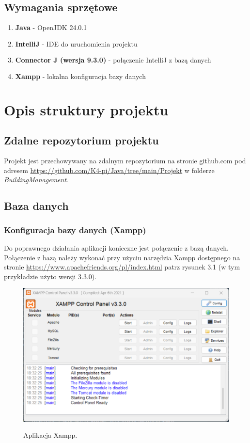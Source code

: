 \section{Wymagania sprzętowe}
\begin{enumerate}
    \item \textbf{Java} - OpenJDK 24.0.1
    \item \textbf{IntelliJ} - IDE do uruchomienia projektu
    \item \textbf{Connector J (wersja 9.3.0)} - połączenie IntelliJ z bazą danych
    \item \textbf{Xampp} - lokalna konfiguracja bazy danych
\end{enumerate}
\chapter{Opis struktury projektu}
\section{Zdalne repozytorium projektu}
Projekt jest przechowywany na zdalnym repozytorium na stronie github.com pod adresem 
\newline \url{https://github.com/K4-pi/Java/tree/main/Projekt} w folderze \textit{BuildingManagement}.

\section{Baza danych}
\subsection{Konfiguracja bazy danych (Xampp)}
Do poprawnego działania aplikacji konieczne jest połączenie z bazą danych.
Połączenie z bazą należy wykonać przy użyciu narzędzia Xampp dostępnego na stronie 
\url{https://www.apachefriends.org/pl/index.html} patrz rysunek 3.1 
(w tym przykładzie użyto wersji 3.3.0).

\begin{figure}[H]
    \centering
    \includegraphics[width=\linewidth]{figures/xampp.eps}\\
    \caption{Aplikacja Xampp.\label{fig1}}
\end{figure}

